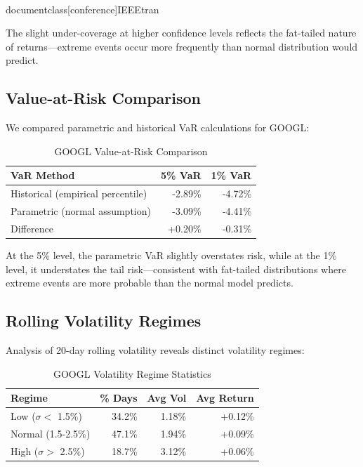 \\documentclass[conference]{IEEEtran}
\begin{document}
The slight under-coverage at higher confidence levels reflects the fat-tailed nature of returns---extreme events occur more frequently than normal distribution would predict.

\subsection{Value-at-Risk Comparison}
We compared parametric and historical VaR calculations for GOOGL:

\begin{table}[H]
\caption{GOOGL Value-at-Risk Comparison}
\begin{center}
\begin{tabular}{|l|r|r|}
\hline
\textbf{VaR Method} & \textbf{5\% VaR} & \textbf{1\% VaR} \\
\hline
Historical (empirical percentile) & -2.89\% & -4.72\% \\
\hline
Parametric (normal assumption) & -3.09\% & -4.41\% \\
\hline
Difference & +0.20\% & -0.31\% \\
\hline
\end{tabular}
\label{tab:googl_var_comparison}
\end{center}
\end{table}

At the 5\% level, the parametric VaR slightly overstates risk, while at the 1\% level, it understates the tail risk---consistent with fat-tailed distributions where extreme events are more probable than the normal model predicts.

\subsection{Rolling Volatility Regimes}
Analysis of 20-day rolling volatility reveals distinct volatility regimes:

\begin{table}[H]
\caption{GOOGL Volatility Regime Statistics}
\begin{center}
\begin{tabular}{|l|r|r|r|}
\hline
\textbf{Regime} & \textbf{\% Days} & \textbf{Avg Vol} & \textbf{Avg Return} \\
\hline
Low ($\sigma <$ 1.5\%) & 34.2\% & 1.18\% & +0.12\% \\
\hline
Normal (1.5-2.5\%) & 47.1\% & 1.94\% & +0.09\% \\
\hline
High ($\sigma >$ 2.5\%) & 18.7\% & 3.12\% & +0.06\% \\
\hline
\end{tabular}
\label{tab:googl_volatility_regimes}
\end{center}
\end{table}
\end{document}
